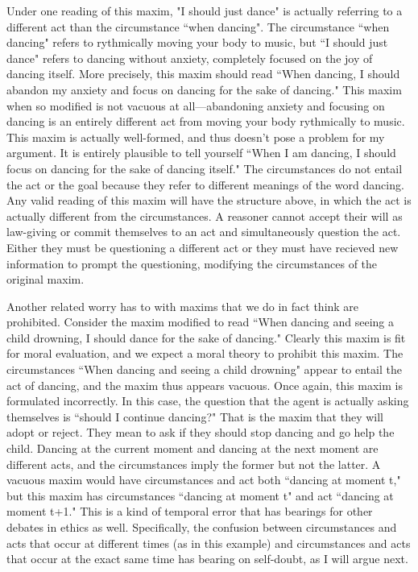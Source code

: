 \begin{isabellebody}
\begin{isamarkuptext}
Under one reading of this maxim, "I should just dance" is actually referring to a different act than the circumstance ``when dancing". 
The circumstance ``when dancing" refers 
to rythmically moving your body to music, but ``I should just dance" refers to dancing without anxiety, 
completely focused on the joy of dancing itself. More precisely, this maxim should read ``When 
dancing, I should abandon my anxiety and focus on dancing for the sake of dancing." This maxim when so 
modified is not vacuous at all—abandoning anxiety and focusing on dancing is an entirely different act 
from moving your body rythmically to music. This maxim is actually well-formed, and thus doesn't
pose a problem for my argument. It is entirely plausible to tell yourself ``When I am dancing, I should focus 
on dancing for the sake of dancing itself." The circumstances do not entail the act or the goal because 
they refer to different meanings of the word dancing. Any valid reading of this maxim will have the structure above, 
in which the act is actually different from the circumstances. A reasoner cannot accept their will 
as law-giving or commit themselves to an act and simultaneously question the act. Either they must be 
questioning a different act or they must have recieved new information to prompt the questioning, 
modifying the circumstances of the original maxim. 

Another related worry has to with maxims that we do in fact think are prohibited. Consider the maxim modified to 
read ``When dancing and seeing a child drowning, I should dance for the sake of dancing." Clearly this 
maxim is fit for moral evaluation, and we expect a moral theory to prohibit this maxim. The circumstances 
``When dancing and seeing a child drowning" appear to entail the act of dancing, and the maxim thus 
appears vacuous. Once again, this maxim is formulated incorrectly. In this case, the question 
that the agent is actually asking themselves is ``should I continue dancing?" That is the 
maxim that they will adopt or reject. They mean to ask if they should stop dancing and go help the child. 
Dancing at the current moment and dancing at the next moment are different acts, and the circumstances 
imply the former but not the latter. A vacuous maxim would have circumstances and act both 
``dancing at moment t," but this maxim has circumstances ``dancing at moment t" and act ``dancing 
at moment t+1." This is a kind of temporal error that has bearings for other debates in ethics as well. 
Specifically, the confusion between circumstances and acts that occur at different times (as in this example) and circumstances 
and acts that occur at the exact same time has bearing on self-doubt, as I will argue next.


\end{isamarkuptext}
\end{isabellebody}
